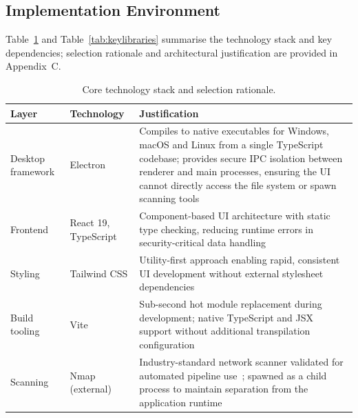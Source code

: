 \documentclass[12pt, a4paper, oneside]{report}
\begin{document}
\subsection{Implementation Environment}
\label{sec:implementation}

Table~\ref{tab:techstack} and Table~\ref{tab:keylibraries} summarise the technology stack and key dependencies; selection rationale and architectural justification are provided in Appendix~C.


\begin{table}[htbp]
\centering
\caption{Core technology stack and selection rationale.}
\label{tab:techstack}
\small
\renewcommand{\arraystretch}{1.45}
\setlength{\tabcolsep}{5pt}
\begin{tabularx}{\textwidth}{
    >{\raggedright\arraybackslash}p{2.2cm}
    >{\raggedright\arraybackslash}p{2.8cm}
    >{\raggedright\arraybackslash}X
}
\toprule
\rowcolor{headerblue}
\textcolor{headertext}{\textbf{Layer}} &
\textcolor{headertext}{\textbf{Technology}} &
\textcolor{headertext}{\textbf{Justification}} \\
\midrule
\rowcolor{rowlight}
Desktop framework &
Electron &
Compiles to native executables for Windows, macOS and Linux from a single TypeScript codebase; provides secure IPC isolation between renderer and main processes, ensuring the UI cannot directly access the file system or spawn scanning tools \\

\rowcolor{rowwhite}
Frontend &
React 19, TypeScript &
Component-based UI architecture with static type checking, reducing runtime errors in security-critical data handling \\

\rowcolor{rowlight}
Styling &
Tailwind CSS &
Utility-first approach enabling rapid, consistent UI development without external stylesheet dependencies \\

\rowcolor{rowwhite}
Build tooling &
Vite &
Sub-second hot module replacement during development; native TypeScript and JSX support without additional transpilation configuration \\

\rowcolor{rowlight}
Scanning &
Nmap (external) &
Industry-standard network scanner validated for automated pipeline use~\cite{singh2024}; spawned as a child process to maintain separation from the application runtime \\


\end{tabularx}
\end{table}
\end{document}
